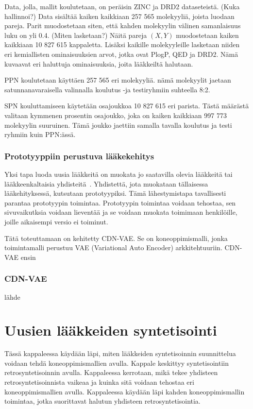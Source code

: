 \documentclass[finnish,twoside,censored,tkt,sw-line]{HYthesisML}
\begin{document}
Data, jolla, mallit koulutetaan, on peräisin ZINC ja DRD2 dataseteistä. (Kuka hallinnoi?)
Data sisältää kaiken kaikkiaan 257 565 molekyyliä, joista luodaan pareja.
Parit muodostetaan siten, että kahden molekyylin välinen samanlaisuus luku on yli 0.4. (Miten lasketaan?)
Näitä pareja \((X,Y)\) muodostetaan kaiken kaikkiaan 10 827 615 kappaletta.
Lisäksi kaikille molekyyleille lasketaan niiden eri kemiallisten ominaisuuksien arvot, jotka ovat PlogP, QED ja DRD2.
Nämä kuvaavat eri haluttuja ominaisuuksia, joita lääkkeiltä halutaan.

PPN koulutetaan käyttäen 257 565 eri molekyyliä.
nämä molekyylit jaetaan satunnanavaraisella valinnalla koulutus -ja testiryhmiin suhteella 8:2.

SPN kouluttamiseen käytetään osajoukkoa 10 827 615 eri parista.
Tästä määrästä valitaan kymmenen prosentin osajoukko, joka on kaiken kaikkiaan 997 773 molekyylin suuruinen.
Tämä joukko jaettiin samalla tavalla koulutus ja testi ryhmiin kuin PPN:ässä.

\subsection{Prototyyppiin perustuva lääkekehitys}

Yksi tapa luoda uusia lääkkeitä on muokata jo saatavilla olevia lääkkeitä tai lääkkeenkaltaisia yhdisteitä~\cite{ShaharHarelAndKiraRadinsky}.
Yhdistettä, jota muokataan tällaisessa lääkehityksessä, kutsutaan prototyypiksi.
Tämä lähestymistapa tavallisesti parantaa prototyypin toimintaa.
Prototyypin  toimintaa voidaan tehostaa, sen sivuvaikutksia voidaan lieventää ja se voidaan muokata toimimaan henkilöille, joille aikaisempi versio ei toiminut.

Tätä toteuttamaan on kehitetty CDN-VAE.
Se on koneoppimismalli, jonka toimintamalli perustuu VAE (Variational Auto Encoder) arkkitehtuuriin.
CDN-VAE ensin

\subsection{CDN-VAE}

lähde~\cite{ShaharHarelAndKiraRadinsky}

\chapter{Uusien lääkkeiden syntetisointi}

Tässä kappaleessa käydään läpi, miten lääkkeiden syntetisoinnin suunnittelua voidaan tehdä koneoppimismallien avulla.
Kappale keskittyy syntetisointiin retrosyntetisoinnin avulla.
Kappaleessa kerrotaan, mikä tekee yhdisteen retrosyntetisoinnista vaikeaa ja kuinka sitä voidaan tehostaa eri koneoppimismallien avulla.
Kappaleessa käydään läpi kahden koneoppimismallin toimintaa, jotka suorittavat halutun yhdisteen retrosyntetisointia.
\end{document}
